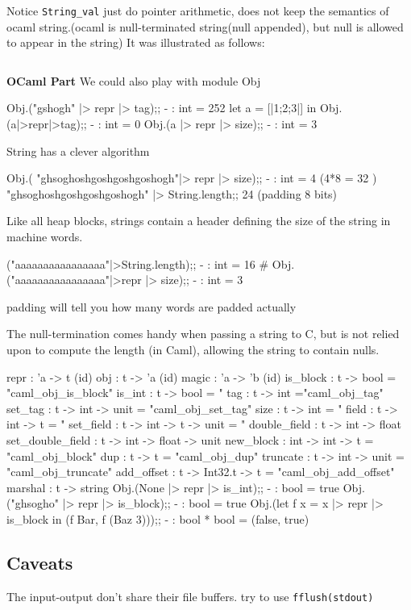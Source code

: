 Notice \verb|String_val| just do pointer arithmetic, does not keep the
semantics of ocaml string.(ocaml is null-terminated string(null
appended), but null is allowed to appear in the string) It was
illustrated as follows:
\inputminted[fontsize=\scriptsize,firstline=29,lastline=46]{c}{code/ffi/inspect/inspect_stubs.c}

\textbf{OCaml Part} We could also play with module Obj
\begin{ocamlcode}
Obj.("gshogh" |> repr |> tag);;
- : int = 252
let a = [|1;2;3|] in Obj.(a|>repr|>tag);;
- : int = 0
Obj.(a |> repr |> size);;
- : int = 3
\end{ocamlcode}

String has a clever algorithm
\begin{ocamlcode}
Obj.( "ghsoghoshgoshgoshgoshogh"|> repr |> size);;
- : int = 4 (4*8 = 32 )
"ghsoghoshgoshgoshgoshogh" |> String.length;;
24 (padding 8 bits)
\end{ocamlcode}

Like all heap blocks, strings contain a header defining
the size of the string in  machine words.

\begin{ocamlcode}
("aaaaaaaaaaaaaaaa"|>String.length);;
- : int = 16
# Obj.("aaaaaaaaaaaaaaaa"|>repr |> size);;
- : int = 3
\end{ocamlcode}
padding will tell you how many words are padded actually

The null-termination comes handy when passing a string to C, but is
not relied upon to compute the length (in Caml), allowing the string
to contain nulls.


\begin{ocamlcode}
repr : 'a -> t (id)
obj : t -> 'a (id)
magic : 'a -> 'b (id)
is_block : t -> bool = "caml_obj_is_block"
is_int : t -> bool = "%
tag : t -> int ="caml_obj_tag" %
set_tag : t -> int -> unit = "caml_obj_set_tag"
size : t -> int = "%
field : t -> int -> t = "%
set_field : t -> int -> t -> unit = "%
double_field : t -> int -> float
set_double_field : t -> int -> float -> unit
new_block : int -> int -> t = "caml_obj_block"
dup : t -> t = "caml_obj_dup"
truncate : t -> int -> unit = "caml_obj_truncate"
add_offset : t -> Int32.t -> t = "caml_obj_add_offset"
marshal : t -> string 
Obj.(None |> repr |> is_int);;
- : bool = true
Obj.("ghsogho" |> repr |> is_block);;
- : bool = true
Obj.(let f x = x |> repr |> is_block in (f Bar, f (Baz 3)));;
- : bool * bool = (false, true)
\end{ocamlcode}


\subsection{Caveats}
\label{sec:ffi}
The input-output don't share their file buffers. try to use
\verb|fflush(stdout)|
  




